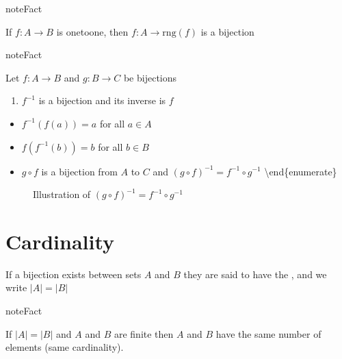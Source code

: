\documentclass[letterpaper,10pt,english]{jupyterBook}
\begin{document}
\begin{sphinxadmonition}{note}{Fact}

\sphinxAtStartPar
If \(f \colon A \to B\) is one\sphinxhyphen{}to\sphinxhyphen{}one, then \(f \colon A \to \mathrm{rng}(f)\) is a bijection
\end{sphinxadmonition}

\begin{sphinxadmonition}{note}{Fact}

\sphinxAtStartPar
Let \(f \colon A \to B\) and \(g \colon B \to C\) be bijections
\begin{enumerate}
%
\item {} 
\sphinxAtStartPar
\(f^{-1}\) is a bijection and its inverse is \(f\)

\end{enumerate}
\begin{itemize}
\item {} 
\sphinxAtStartPar
\(f^{-1}(f(a)) = a\) for all \(a \in A\)

\item {} 
\sphinxAtStartPar
\(f(f^{-1}(b)) = b\) for all \(b \in B\)

\item {} 
\sphinxAtStartPar
\(g \circ f\) is a bijection from \(A\) to \(C\) and \((g \circ f)^{-1}
= f^{-1} \circ g^{-1}\)
\textbackslash{}end\{enumerate\}

\end{itemize}
\end{sphinxadmonition}

\begin{figure}[htbp]
\centering
\capstart

\noindent{}
\caption{Illustration of \((g \circ f)^{-1} = f^{-1} \circ g^{-1}\)}\label{\detokenize{03.set_theory:bij-inv}}\end{figure}


\section{Cardinality}
\label{\detokenize{03.set_theory:cardinality}}
\sphinxAtStartPar
If a bijection exists between sets \(A\) and \(B\) they are said to have the , and we write \(|A| = |B|\)

\begin{sphinxadmonition}{note}{Fact}

\sphinxAtStartPar
If \(|A| = |B|\) and \(A\) and \(B\) are finite then \(A\) and \(B\) have the same number of elements (same cardinality).
\end{sphinxadmonition}
\end{document}
